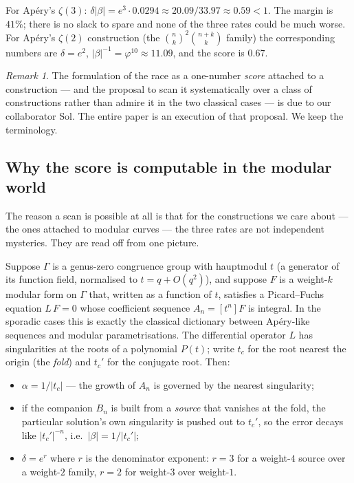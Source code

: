 \documentclass[11pt,reqno]{amsart}
\theoremstyle{plain}
\theoremstyle{definition}
\theoremstyle{remark}
\newtheorem{remark}[theorem]{Remark}
\newcommand{\tc}{t_c}
\newcommand{\tcp}{t_c'}
\begin{document}
For Ap\'ery's $\zeta(3)$: $\delta|\beta| = e^3\cdot 0.0294 \approx
20.09/33.97 \approx 0.59 <1$. The margin is $41\%$; there is no slack to
spare and none of the three rates could be much worse. For Ap\'ery's
$\zeta(2)$ construction (the $\binom{n}{k}^2\binom{n+k}{k}$ family) the
corresponding numbers are $\delta=e^2$, $|\beta|^{-1}=\varphi^{10}
\approx 11.09$, and the score is $0.67$.

\begin{remark}
The formulation of the race as a one-number \emph{score} attached to a
construction --- and the proposal to scan it systematically over a class of
constructions rather than admire it in the two classical cases --- is due
to our collaborator Sol. The entire paper is an execution of that
proposal. We keep the terminology.
\end{remark}

\subsection{Why the score is computable in the modular world}

The reason a scan is possible at all is that for the constructions we
care about --- the ones attached to modular curves --- the three rates are
not independent mysteries. They are read off from one picture.

Suppose $\Gamma$ is a genus-zero congruence group with hauptmodul $t$
(a generator of its function field, normalised to $t=q+O(q^2)$), and
suppose $F$ is a weight-$k$ modular form on $\Gamma$ that, written as a
function of $t$, satisfies a Picard--Fuchs equation
$L\,F=0$ whose coefficient sequence $A_n=[t^n]F$ is integral. In the
sporadic cases this is exactly the classical dictionary between Ap\'ery-like
sequences and modular parametrisations. The differential operator $L$ has
singularities at the roots of a polynomial $P(t)$; write $\tc$ for the
root nearest the origin (the \emph{fold}) and $\tcp$ for the conjugate
root. Then:

\begin{itemize}[leftmargin=1.4em]
\item $\alpha = 1/|\tc|$ --- the growth of $A_n$ is governed by the
  nearest singularity;
\item if the companion $B_n$ is built from a \emph{source} that vanishes
  at the fold, the particular solution's own singularity is pushed out to
  $\tcp$, so the error decays like $|\tcp|^{-n}$, i.e.\
  $|\beta| = 1/|\tcp|$;
\item $\delta=e^r$ where $r$ is the denominator exponent: $r=3$ for a
  weight-$4$ source over a weight-$2$ family, $r=2$ for weight-$3$ over
  weight-$1$.
\end{itemize}
\end{document}
